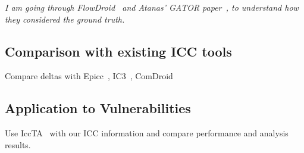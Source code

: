 \emph{I am going through FlowDroid~\cite{flowdroid} and Atanas' GATOR paper~\cite{analysis-callbacks-android}, to understand how they considered the ground truth.}

\subsection{Comparison with existing ICC tools}

Compare deltas with Epicc~\cite{epicc}, IC3~\cite{ic3-icse15},
ComDroid~\cite{comdroid}

\subsection{Application to Vulnerabilities}

Use IccTA~\cite{iccta} with our ICC information and compare performance and analysis results. 
